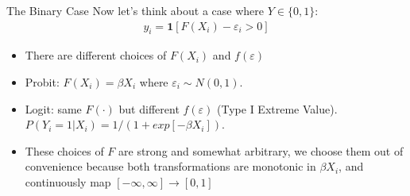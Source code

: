 \documentclass[11pt,handout,xcolor=pdftex,dvipsnames,table,mathserif,aspectratio=169]{beamer}
\begin{document}
%
%
%
%
\begin{frame}{The Binary Case}
Now let's think about a case where $Y \in \{0,1\}$:
\begin{eqnarray*}
y_i = \mathbf{1}[F(X_i) - \varepsilon_i > 0]
\end{eqnarray*}
\begin{itemize}
\item There are different choices of $F(X_i)$ and $f(\varepsilon)$
\item  Probit: $F(X_i) = \beta X_i$ where $\varepsilon_i \sim N(0,1)$.
\item  Logit: same $F(\cdot)$ but different $f(\varepsilon)$ (Type I Extreme Value). $P(Y_i = 1 | X_i) = 1/(1+exp[-\beta X_i])$.
\item These choices of $F$ are strong and somewhat arbitrary, we choose them out of convenience because both transformations are monotonic in $\beta X_i$, and continuously map $[-\infty,\infty] \rightarrow [0,1]$
\end{itemize}
\end{frame}
\end{document}
